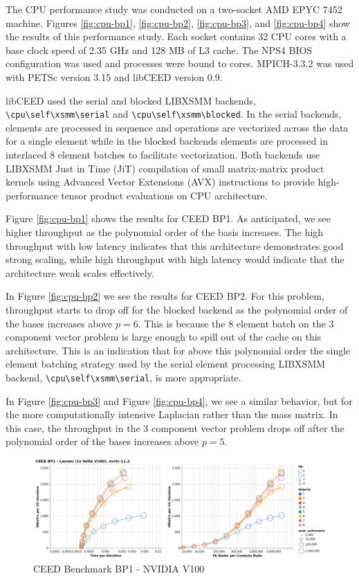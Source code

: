 The CPU performance study was conducted on a two-socket AMD EPYC 7452 machine.
Figures \ref{fig:cpu-bp1}, \ref{fig:cpu-bp2}, \ref{fig:cpu-bp3}, and \ref{fig:cpu-bp4} show the results of this performance study.
Each socket contains 32 CPU cores with a base clock speed of 2.35 GHz and 128 MB of L3 cache.
The NPS4 BIOS configuration was used and processes were bound to cores.
MPICH-3.3.2 was used with PETSc \cite{petsc-user-ref} version 3.15 and libCEED \cite{libceed} version 0.9.

libCEED used the serial and blocked LIBXSMM \cite{libxsmm} backends, \lstinline{\cpu\self\xsmm\serial} and \lstinline{\cpu\self\xsmm\blocked}.
In the serial backends, elements are processed in sequence and operations are vectorized across the data for a single element while in the blocked backends elements are processed in interlaced 8 element batches to facilitate vectorization.
Both backends use LIBXSMM Just in Time (JiT) compilation of small matrix-matrix product kernels using Advanced Vector Extensions (AVX) instructions to provide high-performance tensor product evaluations on CPU architecture.

Figure \ref{fig:cpu-bp1} shows the results for CEED BP1.
As anticipated, we see higher throughput as the polynomial order of the basis increases.
The high throughput with low latency indicates that this architecture demonstrates good strong scaling, while high throughput with high latency would indicate that the architecture weak scales effectively.

In Figure \ref{fig:cpu-bp2} we see the results for CEED BP2.
For this problem, throughput starts to drop off for the blocked backend as the polynomial order of the bases increases above $p = 6$.
This is because the 8 element batch on the 3 component vector problem is large enough to spill out of the cache on this architecture.
This is an indication that for above this polynomial order the single element batching strategy used by the serial element processing LIBXSMM backend, \lstinline{\cpu\self\xsmm\serial}, is more appropriate.

In Figure \ref{fig:cpu-bp3} and Figure \ref{fig:cpu-bp4}, we see a similar behavior, but for the more computationally intensive Laplacian rather than the mass matrix.
In this case, the throughput in the 3 component vector problem drops off after the polynomial order of the bases increases above $p = 5$.

\begin{figure}[ht!]
\includegraphics[width=.99\linewidth]{../img/cudaGenBP1Clip}
\caption{CEED Benchmark BP1 - NVIDIA V100}
\label{fig:gpu-bp1}
\end{figure}

